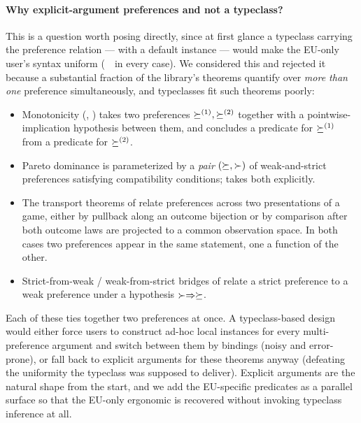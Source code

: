 \paragraph{Why explicit-argument preferences and not a typeclass?}
This is a question worth posing directly, since at first glance a
typeclass \TT{[Preference G]} carrying the preference relation —
with a default  instance — would make the EU-only user's
syntax uniform (~\Profile\ in every case).  We considered
this and rejected it because a substantial fraction of the
library's theorems quantify over \emph{more than one} preference
simultaneously, and typeclasses fit such theorems poorly:

\begin{itemize}\itemsep2pt
\item Monotonicity (, )
  takes two preferences $\succeq^{(1)}, \succeq^{(2)}$ together with a
  pointwise-implication hypothesis between them, and concludes a
  predicate for $\succeq^{(1)}$ from a predicate for $\succeq^{(2)}$.

\item Pareto dominance is parameterized by a \emph{pair} $(\succeq,
  \succ)$ of weak-and-strict preferences satisfying compatibility
  conditions;  takes both
  explicitly.

\item The transport theorems of
   relate preferences across
  two presentations of a game, either by pullback along an outcome
  bijection or by comparison after both outcome laws are projected
  to a common observation space.  In both cases two preferences
  appear in the same statement, one a function of the other.

\item Strict-from-weak / weak-from-strict bridges of
   relate a strict preference
  to a weak preference under a hypothesis $\succ \Rightarrow \succeq$.
\end{itemize}

Each of these ties together two preferences at once.  A typeclass-based
design would either force users to construct ad-hoc local instances
for every multi-preference argument and switch between them by
 bindings (noisy and error-prone), or fall back to
explicit arguments for these theorems anyway (defeating the
uniformity the typeclass was supposed to deliver).  Explicit
arguments are the natural shape from the start, and we add the
EU-specific predicates as a parallel surface so that the EU-only
ergonomic is recovered without invoking typeclass inference at
all.

